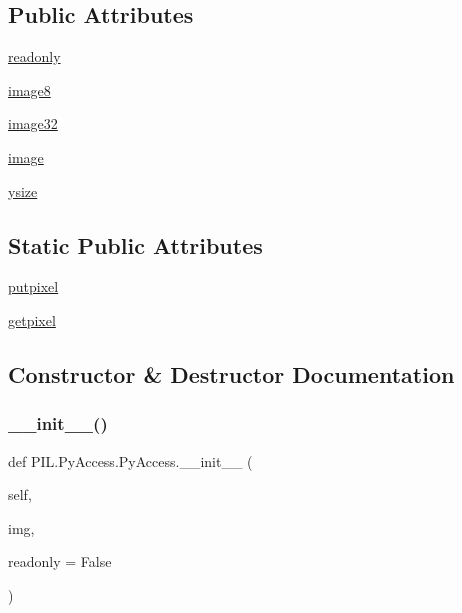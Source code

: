 \subsection*{Public Attributes}
\begin{DoxyCompactItemize}
\item 
\hyperlink{classPIL_1_1PyAccess_1_1PyAccess_ae35e9b5f5d62b7442b659d82023e71d9}{readonly}
\item 
\hyperlink{classPIL_1_1PyAccess_1_1PyAccess_a946521b30a1895eebbc7238274ea4be0}{image8}
\item 
\hyperlink{classPIL_1_1PyAccess_1_1PyAccess_a1dfcc1fd41baaa023f4dc7916d798b44}{image32}
\item 
\hyperlink{classPIL_1_1PyAccess_1_1PyAccess_addcbb7a6e201cb9d9d9410d346b84fd4}{image}
\item 
\hyperlink{classPIL_1_1PyAccess_1_1PyAccess_a6e69035132ffbd03e1bd5ed58c64a29f}{ysize}
\end{DoxyCompactItemize}
\subsection*{Static Public Attributes}
\begin{DoxyCompactItemize}
\item 
\hyperlink{classPIL_1_1PyAccess_1_1PyAccess_a5cdfeef923726d2a8396651a569f5563}{putpixel}
\item 
\hyperlink{classPIL_1_1PyAccess_1_1PyAccess_ad84b9495240a851f5511fb275d85bfa4}{getpixel}
\end{DoxyCompactItemize}


\subsection{Constructor \& Destructor Documentation}
\mbox{\label{classPIL_1_1PyAccess_1_1PyAccess_ab5a3b2aead8d424c62b6357b0d17dee6}} 
\subsubsection{\texorpdfstring{\+\_\+\+\_\+init\+\_\+\+\_\+()}{\_\_init\_\_()}}
{\footnotesize\ttfamily def P\+I\+L.\+Py\+Access.\+Py\+Access.\+\_\+\+\_\+init\+\_\+\+\_\+ (\begin{DoxyParamCaption}\item[{}]{self,  }\item[{}]{img,  }\item[{}]{readonly = {\ttfamily False} }\end{DoxyParamCaption})}



